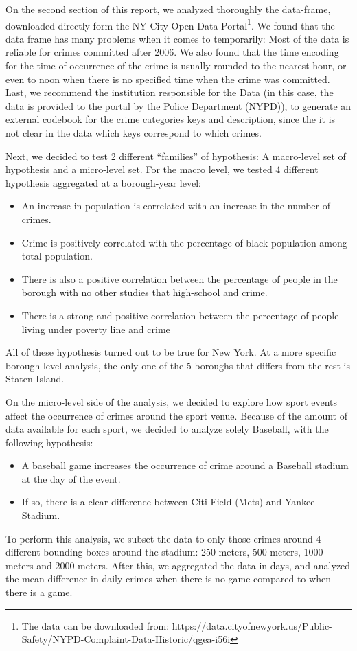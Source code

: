 \documentclass{article}
\begin{document}
On the second section of this report, we analyzed thoroughly the data-frame, downloaded directly form the NY City Open Data Portal\footnote{The data can be downloaded from: https://data.cityofnewyork.us/Public-Safety/NYPD-Complaint-Data-Historic/qgea-i56i}. We found that the data frame has many problems when it comes to temporarily: Most of the data is reliable for crimes committed after 2006. We also found that the time encoding for the time of occurrence of the crime is usually rounded to the nearest hour, or even to noon when there is no specified time when the crime was committed. Last, we recommend the institution responsible for the Data (in this case, the data is provided to the portal by the Police Department (NYPD)), to generate an external codebook for the crime categories keys and description, since the it is not clear in the data which keys correspond to which crimes.

Next, we decided to test 2 different ``families'' of hypothesis: A macro-level set of hypothesis and a micro-level set. For the macro level, we tested 4 different hypothesis aggregated at a borough-year level: 
\begin{itemize}
\item An increase in population is correlated with an increase in the number of crimes.
\item Crime is positively correlated with the percentage of black population among total population. 
\item There is also a positive correlation between the percentage of people in the borough with no other studies that high-school and crime. 
\item There is a strong and positive correlation between the percentage of people living under poverty line and crime
\end{itemize}
All of these hypothesis turned out to be true for New York. At a more specific borough-level analysis, the only one of the 5 boroughs that differs from the rest is Staten Island. 

On the micro-level side of the analysis, we decided to explore how sport events affect the occurrence of crimes around the sport venue. Because of the amount of data available for each sport, we decided to analyze solely Baseball, with the following hypothesis: 
\begin{itemize}
\item A baseball game increases the occurrence of crime around a Baseball stadium at the day of the event. 
\item If so, there is a clear difference between Citi Field (Mets) and Yankee Stadium. 
\end{itemize}
To perform this analysis, we subset the data to only those crimes around 4 different bounding boxes around the stadium: 250 meters, 500 meters, 1000 meters and 2000 meters. After this, we aggregated the data in days, and analyzed the mean difference in daily crimes when there is no game compared to when there is a game. 
\end{document}
